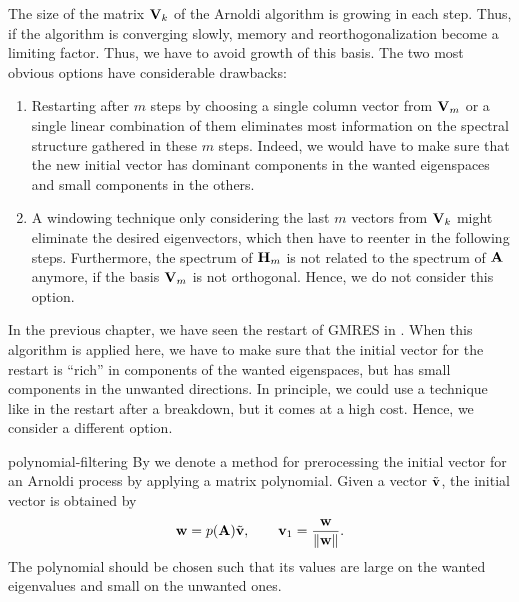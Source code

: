 \begin{intro}
  The size of the matrix $\mathbf V_k$ of the Arnoldi algorithm is growing
  in each step. Thus, if the algorithm is converging slowly, memory
  and reorthogonalization become a limiting factor. Thus, we have to
  avoid growth of this basis. The two most obvious options have
  considerable drawbacks:
  \begin{enumerate}
  \item Restarting after $m$ steps by choosing a single column vector
    from $\mathbf V_m$ or a single linear combination of them eliminates
    most information on the spectral structure gathered in these $m$
    steps. Indeed, we would have to make sure that the new initial
    vector has dominant components in the wanted eigenspaces and
    small components in the others.
  \item A windowing technique only considering the last $m$ vectors
    from $\mathbf V_k$ might eliminate the desired eigenvectors, which
    then have to reenter in the following steps. Furthermore, the
    spectrum of $\mathbf H_m$ is not related to the spectrum of $\mathbf A$
    anymore, if the basis $\mathbf V_m$ is not orthogonal. Hence, we
    do not consider this option.
  \end{enumerate}
\end{intro}

\begin{intro}
  In the previous chapter, we have seen the restart of GMRES in
  . When this algorithm is applied
  here, we have to make sure that the initial vector for the restart
  is ``rich'' in components of the wanted eigenspaces, but has small
  components in the unwanted directions. In principle, we could use a
  technique like in the restart after a breakdown, but it comes at a
  high cost. Hence, we consider a different option.
\end{intro}

\begin{Definition}{polynomial-filtering}
  By  we denote a method for prerocessing
  the initial vector for an Arnoldi process by applying a matrix
  polynomial. Given a vector $\tilde{\mathbf v}$, the initial vector is obtained by
  \begin{gather}
    \mathbf w = p(\mathbf A) \tilde {\mathbf v},\qquad \mathbf v_1 = \frac{\mathbf w}{\lVert\mathbf w\rVert}.
  \end{gather}
  The polynomial should be chosen such that its values are large on
  the wanted eigenvalues and small on the unwanted ones.
\end{Definition}


